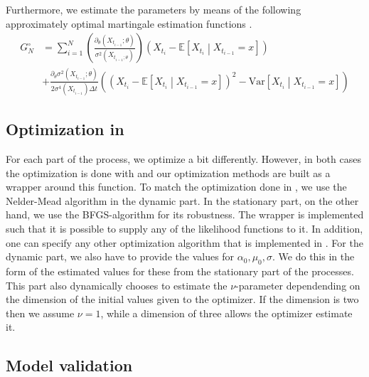 Furthermore, we estimate the parameters by means of the following approximately optimal martingale estimation functions \cite[Example 1.11]{StatisticalMethodsForSDE}.
\begin{align}
    G_N^{\circ} &= \sum_{i = 1}^N 
    \left(
        \frac{\partial_\theta\left(X_{t_{i-1}};\theta\right)}{\sigma^2\left(X_{t_{i-1};\theta}\right)}
    \right) \left(X_{t_{i}} - \mathbb{E}\left[X_{t_{i}} \middle| X_{t_{i-1}} = x\right]\right) \nonumber \\
    &+ \frac{\partial_\theta\sigma^2\left(X_{t_{i-1}}; \theta\right)}{2\sigma^4\left(X_{t_{i - 1}}\right)\Delta t}\left(\left(X_{t_{i}} - \mathbb{E}\left[X_{t_{i}} \middle| X_{t_{i-1}} = x\right]\right)^2 - \textrm{Var}\left[X_{t_{i}} \middle| X_{t_{i-1}} = x\right]\right) \label{eq:approximatelyOptimalMartingale}
\end{align}
\subsection{Optimization in }
For each part of the process, we optimize a bit differently. However, in both cases the optimization is done with  \cite{Rlang} and our optimization methods are built as a wrapper around this function. To match the optimization done in \cite{Ditlevsen2023}, we use the Nelder-Mead algorithm in the dynamic part. In the stationary part, on the other hand, we use the BFGS-algorithm for its robustness. The wrapper is implemented such that it is possible to supply any of the likelihood functions to it. In addition, one can specify any other optimization algorithm that is implemented in . For the dynamic part, we also have to provide the values for $\alpha_0, \mu_0, \sigma$. We do this in the form of the estimated values for these from the stationary part of the processes. This part also dynamically chooses to estimate the $\nu$-parameter dependending on the dimension of the initial values given to the optimizer. If the dimension is two then we assume $\nu = 1$, while a dimension of three allows the optimizer estimate it.
\subsection{Model validation}